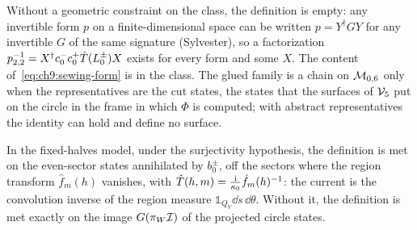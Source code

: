 Without a geometric constraint on the class, the definition is empty: any invertible form $p$ on a finite-dimensional space can be written $p = Y^\dagger G Y$ for any invertible $G$ of the same signature (Sylvester), so a factorization $p_{2,2}^{-1} = X^\dagger c_0^- c_0^+ \hat T(L_0^\pm) X$ exists for every form and some $X$.
The content of~\eqref{eq:ch9:sewing-form} is in the class.
The glued family is a chain on ${\mathcal{M}}_{0, 6}$ only when the representatives are the cut states, the states that the surfaces of $\mathcal{V}_{5}$ put on the circle in the frame in which $\Phi$ is computed; with abstract representatives the identity can hold and define no surface.

In the fixed-halves model, under the surjectivity hypothesis, the definition is met on the even-sector states annihilated by $b_0^\pm$, off the sectors where the region transform $\hat f_m(h)$ vanishes, with $\hat T(h, m) = \tfrac{\mathrm{i}}{\kappa_0} \hat f_m(h)^{-1}$: the current is the convolution inverse of the region measure $\mathbb 1_{Q_V} \dd s \, \dd \theta$.
Without it, the definition is met exactly on the image $G(\pi_W {\mathcal{I}})$ of the projected circle states.

